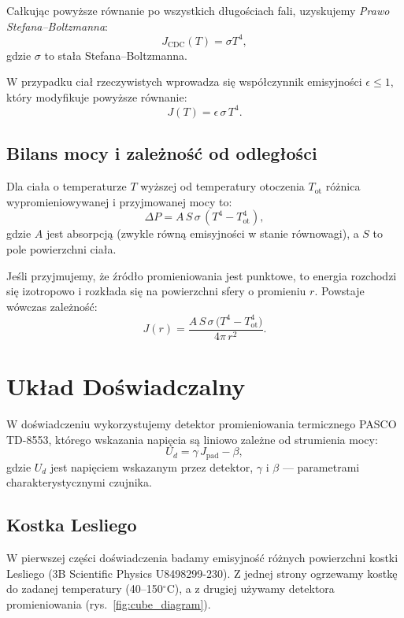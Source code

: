 \documentclass[12pt]{article}
\begin{document}
Całkując powyższe równanie po wszystkich długościach fali, uzyskujemy \emph{Prawo Stefana–Boltzmanna}:
\begin{equation}
	J_{\mathrm{CDC}}(T) = \sigma T^4,
	\label{eq:boltzman_law}
\end{equation}
gdzie $\sigma$ to stała Stefana–Boltzmanna. 

W przypadku ciał rzeczywistych wprowadza się współczynnik emisyjności $\epsilon \le 1$, który modyfikuje powyższe równanie:
\begin{equation}
	J(T) = \epsilon\,\sigma\,T^4.
	\label{eq:boltzman_law_epsilon}
\end{equation}

\subsection{Bilans mocy i zależność od odległości}
Dla ciała o temperaturze $T$ wyższej od temperatury otoczenia $T_{\mathrm{ot}}$ różnica wypromieniowywanej i przyjmowanej mocy to:
\begin{equation}
	\Delta P = A\,S\,\sigma\,(T^4 - T_{\mathrm{ot}}^4),
	\label{eq:power_loss}
\end{equation}
gdzie $A$ jest absorpcją (zwykle równą emisyjności w stanie równowagi), a $S$ to pole powierzchni ciała.

Jeśli przyjmujemy, że źródło promieniowania jest punktowe, to energia rozchodzi się izotropowo i rozkłada się na powierzchni sfery o promieniu $r$. Powstaje wówczas zależność:
\begin{equation}
	J(r) = \frac{A\,S\,\sigma\,\bigl(T^4 - T_{\mathrm{ot}}^4\bigr)}{4\pi\,r^2}.
	\label{eq:power_flux}
\end{equation}

\section{Układ Doświadczalny}
W doświadczeniu wykorzystujemy detektor promieniowania termicznego PASCO TD-8553, którego wskazania napięcia są liniowo zależne od strumienia mocy:
\begin{equation}
	U_d = \gamma \,J_{\mathrm{pad}} - \beta,
	\label{eq:measurment_device}
\end{equation}
gdzie $U_d$ jest napięciem wskazanym przez detektor, $\gamma$ i $\beta$ — parametrami charakterystycznymi czujnika.

\subsection{Kostka Lesliego}
W pierwszej części doświadczenia badamy emisyjność różnych powierzchni kostki Lesliego (3B Scientific Physics U8498299-230). Z jednej strony ogrzewamy kostkę do zadanej temperatury (40--150$^\circ$C), a z drugiej używamy detektora promieniowania (rys.~\ref{fig:cube_diagram}).
\end{document}
